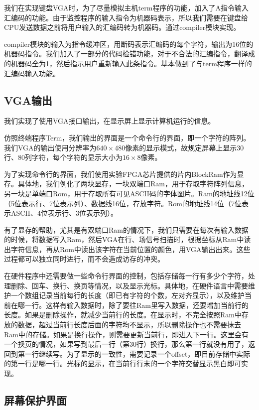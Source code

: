 我们在实现键盘VGA时，为了尽量模拟主机term程序的功能，加入了A指令输入汇编码的功能。由于监控程序的输入指令为机器码表示，所以我们需要在键盘给CPU发送数据之前将用户输入的汇编码转为机器码。通过compiler模块实现。

compiler模块的输入为指令缓冲区，用断码表示汇编码的每个字符，输出为16位的机器码指令。我们加入了一部分的代码检错功能，对于不合法的汇编指令，翻译成的机器码全为1，然后指示用户重新输入此条指令。基本做到了与term程序一样的汇编码输入功能。

\subsection{VGA输出}

我们实现了使用VGA接口输出，在显示屏上显示计算机运行的信息。

仿照终端程序Term，我们输出的界面是一个命令行的界面，即一个字符的阵列。我们VGA的输出使用分辨率为$640\times 480$像素的显示模式，故规定屏幕上显示30行、80列字符，每个字符的显示大小为$16\times 8$像素。

为了实现命令行的界面，我们使用实验FPGA芯片提供的片内BlockRam作为显存。具体地，我们例化了两块显存，一块双端口Ram，用于存取字符阵列信息，另一块是单端口Rom，用于存取所有可见ASCII码的字体图片。Ram的地址线12位（5位表示行、7位表示列）、数据线16位，存放字符。Rom的地址线14位（7位表示ASCII、4位表示行、3位表示列）。

有了显存的帮助，尤其是有双端口Ram的情况下，我们只需要在每次有输入数据的时候，将数据写入Ram，然后VGA在行、场信号扫描时，根据坐标从Ram中读出字符信息，再从Rom中读出该字符在当前位置的颜色，用VGA输出出来。这些过程都可以独立同时进行，而不会造成访存的冲突。

在硬件程序中还需要做一些命令行界面的控制，包括存储每一行有多少个字符，处理删除、回车、换行、换页等情况，以及显示光标。具体地，在硬件语言中需要维护一个数组记录当前每行的长度（即已有字符的个数，左对齐显示），以及维护当前在哪一行。这样有输入数据时，除了要往Ram里写入数据，还要增加当前行的长度。如果是删除操作，就减少当前行的长度。在显示时，不完全按照Ram中存放的数据，超过当前行长度后面的字符均不显示，所以删除操作也不需要抹去Ram中的存储。如果是换行操作，则需要更新当前行，即进入下一行。这里会有一个换页的情况，如果写到最后一行（第30行）换行，那么第一行就没有用了，返回到第一行继续写。为了显示的一致性，需要记录一个offset，即目前存储中实际的第一行是哪一行。光标的显示，在当前行行末的一个字符交替显示黑白即可实现。

\subsection{屏幕保护界面}

